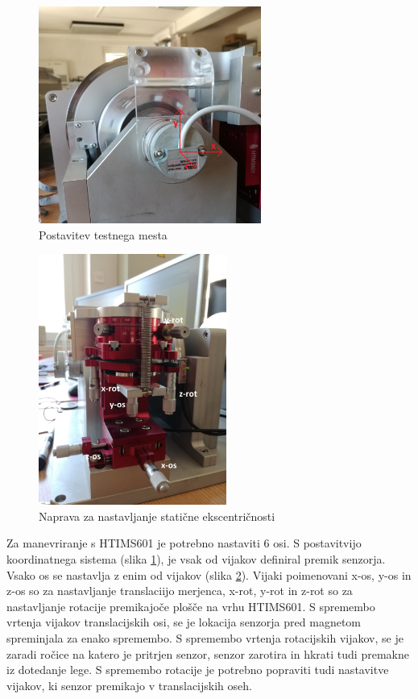 \begin{figure}[h!]
	\centering
	\includegraphics[width=0.65\textwidth]{./Slike/koordinatnisistem.jpg}
	\caption{Postavitev testnega mesta}
	\label{koordinatnisistem.jpg}
\end{figure}
\begin{figure}[h!]
	\centering
	\includegraphics[width=0.55\textwidth]{./Slike/HTIMS601.jpg}
	\caption{Naprava za nastavljanje statične ekscentričnosti}
	\label{HTIMS601.jpg}
\end{figure}
Za manevriranje s HTIMS601 je potrebno nastaviti 6 osi.
S postavitvijo koordinatnega sistema (slika \ref{koordinatnisistem.jpg}), je vsak od vijakov definiral premik senzorja. 
Vsako os se nastavlja z enim od vijakov (slika \ref{HTIMS601.jpg}). Vijaki poimenovani x-os, y-os in z-os so za nastavljanje translaciijo merjenca, x-rot, y-rot in z-rot so za nastavljanje rotacije premikajoče plošče na vrhu HTIMS601.
S spremembo vrtenja vijakov translacijskih osi, se je lokacija senzorja pred magnetom spreminjala za enako spremembo. S spremembo vrtenja rotacijskih vijakov, se je zaradi ročice na katero je pritrjen senzor, senzor zarotira in hkrati tudi premakne iz dotedanje lege. S spremembo rotacije je potrebno popraviti tudi nastavitve vijakov, ki senzor premikajo v translacijskih oseh.

